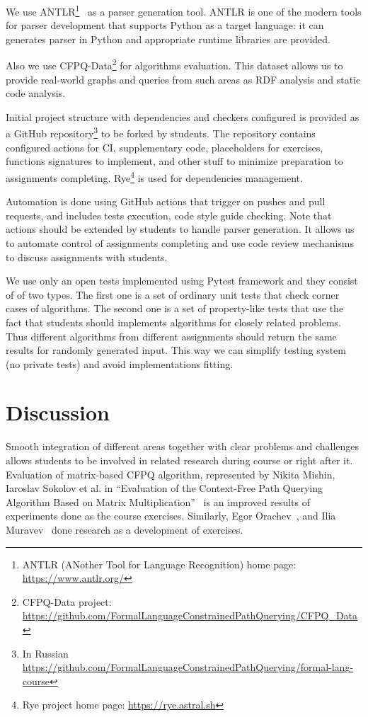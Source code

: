 \documentclass[sigconf]{acmart}
\begin{document}
We use ANTLR\footnote{ANTLR (ANother Tool for Language Recognition) home page: \url{https://www.antlr.org/}}~\cite{10.5555/2501720} as a parser generation tool.
ANTLR is one of the modern tools for parser development that supports Python as a target language: it can generates parser in Python and appropriate runtime libraries are provided.

Also we use CFPQ-Data\footnote{CFPQ-Data project: \url{https://github.com/FormalLanguageConstrainedPathQuerying/CFPQ_Data}} for algorithms evaluation.
This dataset allows us to provide real-world graphs and queries from such areas as RDF analysis and static code analysis. 

Initial project structure with dependencies and checkers configured is provided as a GitHub repository\footnote{In Russian \url{https://github.com/FormalLanguageConstrainedPathQuerying/formal-lang-course}} to be forked by students.
The repository contains configured actions for CI, supplementary code, placeholders for exercises, functions signatures to implement, and other stuff to minimize preparation to assignments completing.
Rye\footnote{Rye project home page: \url{https://rye.astral.sh}} is used for dependencies management.

Automation is done using GitHub actions that trigger on pushes and pull requests, and includes tests execution, code style guide checking.
Note that actions should be extended by students to handle parser generation.
It allows us to automate control of assignments completing and use code review mechanisms to discuss assignments with students.

We use only an open tests implemented using Pytest framework and they consist of of two types.
The first one is a set of ordinary unit tests that check corner cases of algorithms.
The second one is a set of property-like tests that use the fact that students should implements algorithms for closely related problems.
Thus different algorithms from different assignments should return the same results for randomly generated input. 
This way we can simplify testing system (no private tests) and avoid implementations fitting. 

\section{Discussion}

Smooth integration of different areas together with clear problems and challenges allows students to be involved in related research during course or right after it. 
Evaluation of matrix-based CFPQ algorithm, represented by Nikita Mishin, Iaroslav Sokolov et al. in ``Evaluation of the Context-Free Path Querying Algorithm Based on Matrix Multiplication''~\cite{10.1145/3327964.3328503} is an improved results of experiments done as the course exercises. 
Similarly, Egor Orachev~\cite{10.1007/978-3-030-54832-2_6}, and Ilia Muravev~\cite{muravev2024optimizationcontextfreelanguagereachability} done research as a development of exercises.
\end{document}
